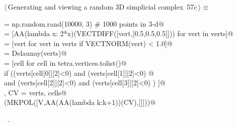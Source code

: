 \documentclass[11pt,oneside]{article}    %
\begin{document}
\begin{flushleft} \small \label{scrap102}
\protect{}$\langle\,$Generating and viewing a random 3D simplicial complex\nobreak\ {\footnotesize 57c}$\,\rangle\equiv$
\vspace{-1ex}
\begin{list}{}{} \item
\mbox{}\verb@verts = np.random.rand(10000, 3) # 1000 points in 3-d@\\
\mbox{}\verb@verts = [AA(lambda x: 2*x)(VECTDIFF([vert,[0.5,0.5,0.5]])) for vert in verts]@\\
\mbox{}\verb@verts = [vert for vert in verts if VECTNORM(vert) < 1.0]@\\
\mbox{}\verb@tetra = Delaunay(verts)@\\
\mbox{}\verb@cells = [cell for cell in tetra.vertices.tolist()@\\
\mbox{}\verb@         if  ((verts[cell[0]][2]<0) and (verts[cell[1]][2]<0) @\\
\mbox{}\verb@                 and (verts[cell[2]][2]<0) and (verts[cell[3]][2]<0) ) ]@\\
\mbox{}\verb@V, CV = verts, cells@\\
\mbox{}\verb@VIEW(MKPOL([V,AA(AA(lambda k:k+1))(CV),[]]))@\\
\mbox{}\verb@@{\NWsep}
\end{list}
\vspace{-1ex}
\footnotesize\addtolength{\baselineskip}{-1ex}
\begin{list}{}{\setlength{\itemsep}{-\parsep}\setlength{\itemindent}{-\leftmargin}}
\item \NWtxtMacroRefIn\ .
\end{list}
\end{flushleft}
\end{document}
